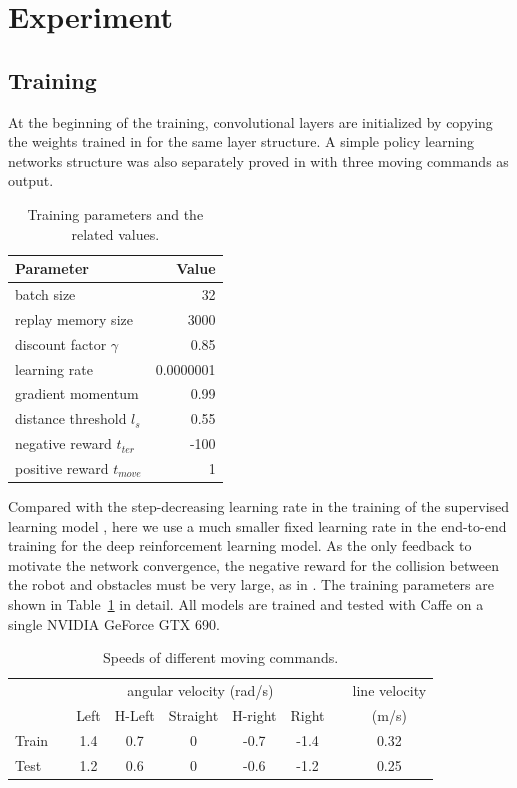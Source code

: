 \section{Experiment}
\label{sec:ob_experiment}
\subsection{Training}
At the beginning of the training, convolutional layers are initialized by copying the weights trained in \cite{tai2016deep} for the same layer structure. A simple policy learning networks structure was also separately proved in \cite{tl_rcar_2016} with three moving commands as output.
\begin{table}[!ht]
    \centering
    \caption{Training parameters and the related values.}
    \label{tab:ob_training_parameters}
    \begin{tabular}{l r}
    \hline
    Parameter  & Value\\
    \hline
    batch size&32\\
    replay memory size & 3000\\
    discount factor $\gamma$ & 0.85\\
    learning rate & 0.0000001\\
    gradient momentum & 0.99\\
    distance threshold  $l_s$ & 0.55\\
    negative reward  $t_{ter}$ & -100\\
    positive reward  $t_{move}$ & 1\\
    \hline
    \end{tabular}
\end{table}

Compared with the step-decreasing learning rate in the training of the supervised learning model \cite{tai2016deep}, here we use a much smaller fixed learning rate in the end-to-end training for the deep reinforcement learning model. As the only feedback to motivate the network convergence, the negative reward for the collision between the robot and obstacles must be very large, as in \cite{tl_rcar_2016}. The training parameters are shown in Table~\ref{tab:ob_training_parameters} in detail. All models are trained and tested with Caffe \cite{jia2014caffe} on a single NVIDIA GeForce GTX 690.
\begin{table}[!ht]
    \centering
    \caption{Speeds of different moving commands.}
    \label{tab:moving_commands}
    \begin{tabular}{l  c c c c c c c c }
    \hline
        & &\multicolumn{5}{c}{ angular velocity (rad/s) }  & &line velocity  \\
       & & Left & H-Left & Straight & H-right & Right& & (m/s) \\
    \hline
    Train & & 1.4 & 0.7&0 & -0.7& -1.4 & & 0.32\\
    \hline
    Test & &1.2& 0.6& 0& -0.6&-1.2 & &0.25\\
    \hline
    \end{tabular}
\end{table}

